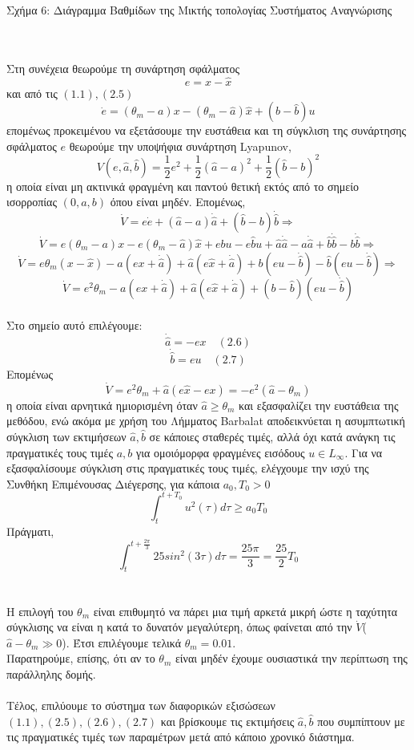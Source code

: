 \documentclass[12pt]{article}
\begin{document}
\centerline{Σχήμα 6: Διάγραμμα Βαθμίδων της Μικτής τοπολογίας Συστήματος Αναγνώρισης}
\\ \\
Στη συνέχεια θεωρούμε τη συνάρτηση σφάλματος 
\[e=x-\hat{x}\]
και από τις $(1.1),(2.5)$
\[\dot{e}=(\theta_m-a)x-(\theta_m-\hat{a})\hat{x}+(b-\hat{b})u  \]
επομένως προκειμένου να εξετάσουμε την ευστάθεια και τη σύγκλιση της συνάρτησης σφάλματος $e$ θεωρούμε την υποψήφια συνάρτηση Lyapunov,
\[V(e,\hat{a},\hat{b})=\frac{1}{2}e^{2}+\frac{1}{2}(\hat{a}-a)^2 + \frac{1}{2}(\hat{b}-b)^2\] η οποία είναι μη ακτινικά φραγμένη και παντού θετική εκτός από το σημείο ισορροπίας $(0,a,b)$ όπου είναι μηδέν.
Επομένως,
\[ \dot{V}=e\dot{e}+(\hat{a}-a)\dot{\hat{a}} +(\hat{b}-b)\dot{\hat{b}} \Rightarrow \]
\[\dot{V}= e(\theta_m-a)x-e(\theta_m-\hat{a})\hat{x}+ebu-e\hat{b}u+\hat{a}\dot{\hat{a}}-a\dot{\hat{a}}+\hat{b}\dot{\hat{b}}-b\dot{\hat{b}} \Rightarrow \]
\[\dot{V}= e\theta_m(x-\hat{x})-a(ex+\dot{\hat{a}})+\hat{a}(e\hat{x}+\dot{\hat{a}}) +b(eu-\dot{\hat{b}})-\hat{b}(eu-\dot{\hat{b}}) \Rightarrow \]
\[ \dot{V}=e^2\theta_m -a(ex+\dot{\hat{a}})+\hat{a}(e\hat{x}+\dot{\hat{a}}) +(b-\hat{b})(eu-\dot{\hat{b}})\]
\\
Στο σημείο αυτό επιλέγουμε:
\[ \dot{\hat{a}}=-ex \quad (2.6)\]
\[\dot{\hat{b}}=eu \quad (2.7)\]
Επομένως
\[ \dot{V}= e^2\theta_m+\hat{a}(e\hat{x}-ex)=-e^{2}(\hat{a}-\theta_m) \]
η οποία είναι αρνητικά ημιορισμένη όταν $\hat{a}\geq\theta_m$ και εξασφαλίζει την ευστάθεια της μεθόδου, ενώ ακόμα με χρήση του Λήμματος Barbalat αποδεικνύεται η ασυμπτωτική σύγκλιση των εκτιμήσεων $\hat{a},\hat{b}$ σε κάποιες σταθερές τιμές, αλλά όχι κατά ανάγκη τις πραγματικές τους τιμές $a,b$ για ομοιόμορφα φραγμένες εισόδους $u \in L_{\infty}$. Για να εξασφαλίσουμε σύγκλιση στις πραγματικές τους τιμές, ελέγχουμε την ισχύ της Συνθήκη Επιμένουσας Διέγερσης, για κάποια $a_0,T_0 > 0 $
\[ \int_{t}^{t+T_0} u^2(\tau)d\tau  \geq a_0T_0 \]
Πράγματι,
\[ \int_{t}^{t+\frac{2\pi}{3}} 25sin^2(3\tau)d\tau =\frac{25\pi}{3}=\frac{25}{2}T_0 \]
\\ \\
Η επιλογή του $\theta_m$ είναι επιθυμητό να πάρει μια τιμή αρκετά μικρή ώστε η ταχύτητα σύγκλισης να είναι η κατά το δυνατόν μεγαλύτερη, όπως φαίνεται από την $\dot{V}$\quad ($\hat{a}-\theta_m \gg 0$). Έτσι επιλέγουμε τελικά $\theta_m=0.01$. \\
Παρατηρούμε, επίσης, ότι αν το $\theta_m$ είναι μηδέν έχουμε ουσιαστικά την περίπτωση της παράλληλης δομής.
\\ \\
Τέλος, επιλύουμε το σύστημα των διαφορικών εξισώσεων $(1.1),(2.5),(2.6),(2.7)$ και βρίσκουμε τις εκτιμήσεις $\hat{a},\hat{b}$ που συμπίπτουν με τις πραγματικές τιμές των παραμέτρων μετά από κάποιο χρονικό διάστημα.
\end{document}
